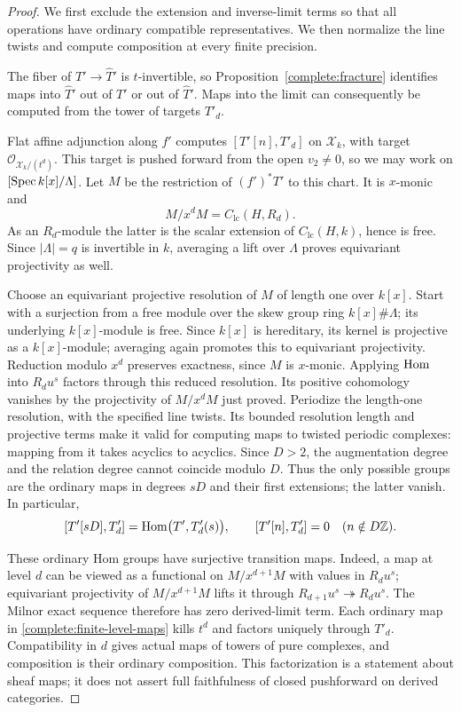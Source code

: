 \begin{proof}
We first exclude the extension and inverse-limit terms so that all
operations have ordinary compatible representatives. We then normalize
the line twists and compute composition at every finite precision.

The fiber of $T'\to\widehat T'$ is
$t$-invertible, so Proposition~\ref{complete:fracture} identifies maps
into $\widehat T'$ out of $T'$ or out of $\widehat T'$.
Maps into the limit can consequently be computed from the tower
of targets $T'_d$.

Flat affine adjunction along $f'$ computes
$[T'[n],T'_d]$ on $\mathcal X_k$, with target
$\mathcal O_{\mathcal X_k/(t^d)}$. This target is pushed forward
from the open $v_2\ne0$, so we may work on
$[\operatorname{Spec} k[x]/\Lambda]$. Let $M$ be the restriction of
$(f')^*T'$ to this chart. It is $x$-monic and
\[
 M/x^dM=C_{\mathrm{lc}}(H,R_d).
\]
As an $R_d$-module the latter is the scalar extension of
$C_{\mathrm{lc}}(H,k)$, hence is free. Since $|\Lambda|=q$
is invertible in $k$, averaging a lift over $\Lambda$ proves
equivariant projectivity as well.

Choose an equivariant projective resolution of $M$ of length one
over $k[x]$. Start with a surjection from a free module over the
skew group ring $k[x]\#\Lambda$; its underlying $k[x]$-module is free.
Since $k[x]$ is hereditary, its kernel is projective as a
$k[x]$-module; averaging again promotes this to equivariant projectivity.
Reduction modulo $x^d$ preserves exactness, since $M$ is $x$-monic.
Applying $\operatorname{Hom}$ into $R_du^s$ factors through this reduced
resolution. Its positive cohomology vanishes by the projectivity of
$M/x^dM$ just proved. Periodize the length-one resolution, with the
specified line twists. Its bounded resolution length and projective
terms make it valid for computing maps to twisted periodic complexes:
mapping from it takes acyclics to acyclics. Since $D>2$, the
augmentation degree and the relation degree cannot coincide modulo
$D$. Thus the only possible groups are the ordinary maps in degrees
$sD$ and their first extensions; the latter vanish. In particular,
\begin{equation}
\label{complete:finite-level-maps}
 [T'[sD],T'_d]
   =\operatorname{Hom}\bigl(T',T'_d(s)\bigr),
 \qquad
 [T'[n],T'_d]=0\quad(n\notin D\mathbb Z).
\end{equation}

These ordinary Hom groups have surjective transition maps. Indeed,
a map at level $d$ can be viewed as a functional on
$M/x^{d+1}M$ with values in $R_du^s$; equivariant projectivity of
$M/x^{d+1}M$ lifts it through
$R_{d+1}u^s\twoheadrightarrow R_du^s$. The Milnor exact sequence
therefore has zero derived-limit term. Each ordinary map in
\eqref{complete:finite-level-maps} kills $t^d$ and factors uniquely
through $T'_d$. Compatibility in $d$ gives actual maps of towers of
pure complexes, and composition is their ordinary composition. This
factorization is a statement about sheaf maps; it does not assert
full faithfulness of closed pushforward on derived categories.


\end{proof}
